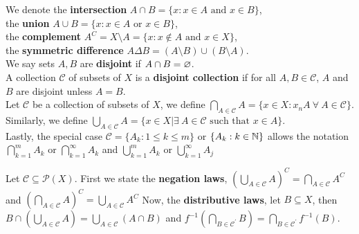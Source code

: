 \begin{definition}
	We denote the \textbf{intersection} $A \cap B = \{x: x\in A \text{ and } x \in B\} $,\\
	the \textbf{union} $A \cup B= \{x: x \in A \text{ or } x \in B\} $,\\
	the \textbf{complement} $A^{C}= X \setminus A = \{x: x \not\in A \text{ and } x \in X \} $, \\
	the \textbf{symmetric difference} $A \Delta B = \left( A \setminus B \right) \cup \left( B \setminus A \right) $. \\
	We say sets $A, B$ are \textbf{disjoint} if $A \cap B = \varnothing$.\\
	A collection $\mathscr{C}$ of subsets of $X$ is a \textbf{disjoint collection} if for all $A, B \in \mathscr{C}$, $A$ and $B$ are disjoint unless $A = B$.\\
	Let $\mathscr{C}$ be a collection of subsets of $X$, we define $\bigcap _{A \in \mathscr{C}} A = \{x \in X : x _{n} A \ \forall \ A \in \mathscr{C} \} $.\\
	Similarly, we define $ \bigcup_{A \in \mathscr{C}} A = \{x \in X | \exists \ A \in \mathscr{C} \text{ such that } x \in A\} $.\\
	Lastly, the special case $\mathscr{C} = \{ A_{k} : 1 \le k \le m\} $ or $ \{A_{k} : k \in \mathbb{N} \} $ allows the notation $\bigcap _{k=1}^{m}A_{k}$ or $\bigcap _{k=1}^{\infty}A_{k}$ and $\bigcup _{k=1}^{m} A_{k}$ or $\bigcup _{k=1}^{ \infty} A_{j}$
\end{definition}
\begin{definition}
	Let $\mathscr{C} \subseteq \mathscr{P} \left( X \right) $. First we state the \textbf{negation laws}, $\left( \bigcup_{A \in \mathscr{C}} A  \right)^{C}= \bigcap _{A \in \mathscr{C}}A^{C} $ and $\left( \bigcap _{A \in \mathscr{C}} A \right) ^{C}= \bigcup _{A \in \mathscr{C}} A^{C}$
	Now, the \textbf{distributive laws}, let $B \subseteq X$, then $B \cap \left( \bigcup_{A \in \mathscr{C}} A \right) = \bigcup _{A \in \mathscr{C}}\left( A \cap B \right) $ and $f^{-1}\left( \bigcap_{B \in \mathscr{C}^{\prime}} B\right) = \bigcap _{B \in \mathscr{C}^{\prime}}f^{-1}\left( B \right) 	$.
\end{definition}
